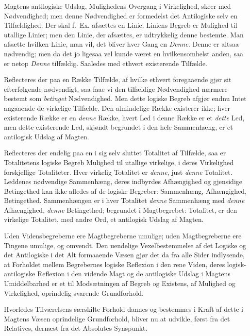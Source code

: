 \documentclass[12pt]{book}
\newcommand{\opage}[1]{\marginnote{\footnotesize\textit{[#1]}}}
\begin{document}
Magtens antilogiske Udslag, Mulighedens Overgang i
Virkelighed, skeer med Nødvendighed; men denne
Nødvendighed er formedelst det Antilogiske selv en Tilfældighed.
Der skal f.~Ex. afsættes en Linie. Liniens Begreb er
Mulighed til utallige Linier; men den Linie, der afsættes, er
udtrykkelig denne bestemte. Man afsætte hvilken Linie, man
vil, det bliver hver Gang en \emph{Denne}. Denne er altsaa
nødvendig; men da det jo ligesaa vel kunde været en
hvilkensomhelst anden, saa er netop \emph{Denne} tilfældig.
Saaledes med ethvert existerende Tilfælde.

Reflecteres der paa en Række Tilfælde, af hvilke
ethvert foregaaende gjør sit efterfølgende nødvendigt, saa faae
vi den tilfældige Nødvendighed nærmere bestemt som
\emph{betinget} Nødvendighed. Men dette logiske Begreb afgjør
endnu Intet angaaende de virkelige Tilfælde. Den
almindelige Række existerer ikke; hver existerende Række er en
\emph{denne} Række, hvert Led i denne Række er et \emph{dette} Led,
men dette existerende Led, skjøndt begrundet i den hele
Sammenhæng, er et antilogisk Udslag af Magten.

Reflecteres der endelig paa en i sig selv sluttet
Totalitet af Tilfælde, saa er Totalitetens logiske Begreb Mulighed
\opage{30} til utallige virkelige, i deres Virkelighed forskjellige
Totaliteter. Hver virkelig Totalitet er \emph{denne}, just \emph{denne}
Totalitet. Leddenes nødvendige Sammenhæng, deres
indbyrdes Afhængighed og gjensidige Betingethed kan ikke
afledes af de logiske Begreber: Sammenhæng, Afhængighed,
Betingethed. Sammenhængen er i hver Totalitet \emph{denne}
Sammenhæng med \emph{denne} Afhængighed, \emph{denne}
Betingethed; begrundet i Magtbegrebet: Totalitet, er den
virkelige Totalitet, med andre Ord, et antilogisk Udslag af
Magten.

Uden Vidensbegreberne ere Magtbegreberne umulige;
uden Magtbegreberne ere Tingene umulige, og omvendt.
Den uendelige Vexelbestemmelse af det Logiske og det
Antilogiske i det Alt formaaende Væsen gjør det da fra alle
Sider indlysende, at Forholdet mellem Begrebernes logiske
Reflexion i den rene Viden, deres logisk-antilogiske Reflexion
i den vidende Magt og de antilogiske Udslag i Magtens
Umiddelbarhed er et til Modsætningen af Begreb og
Existens, af Mulighed og Virkelighed, oprindelig svarende
Grundforhold.

Hvorledes Tilværelsens særskilte Forhold dannes og
bestemmes i Kraft af dette i Magtens Væsen oprindelige
Grundforhold, bliver nu at udvikle, først fra det Relatives,
dernæst fra det Absolutes Synspunkt.
\end{document}

